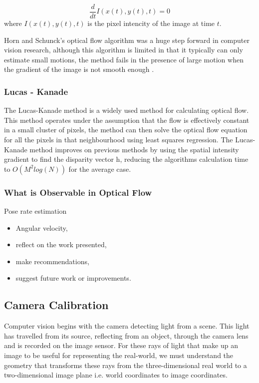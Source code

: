 \documentclass{UoNMCHA}
\numberwithin{equation}{section}
\begin{document}
\begin{equation}
	\frac{d}{dt} I(x(t), y(t), t) = 0
\end{equation}
where $I(x(t), y(t), t)$ is the pixel intencity of the image at time $t$.

Horn and Schunck's optical flow algorithm was a huge step forward in computer vision research, although this algorithm is limited in that it typically can only estimate small motions, the method fails in the presence of large motion when the gradient of the image is not smooth enough \citep{meinhardt2013horn}.
\subsubsection{Lucas - Kanade} %
The Lucas-Kanade method is a widely used method for calculating optical flow. This method operates under the assumption that the flow is effectively constant in a small cluster of pixels, the method can then solve the optical flow equation for all the pixels in that neighbourhood using least squares regression. The Lucas-Kanade method improves on previous methods by using the spatial intensity gradient to find the disparity vector h, reducing the algorithms calculation time to $O(M^2log(N))$ for the average case.

\subsubsection{What is Observable in Optical Flow}
Pose rate estimation

\begin{itemize}
	\item Angular velocity,
	\item reflect on the work presented, 
	\item make recommendations,
	\item suggest future work or improvements.
\end{itemize}

\subsection{Camera Calibration} %
Computer vision begins with the camera detecting light from a scene. This light has travelled from its source, reflecting from an object, through the camera lens and is recorded on the image sensor. For these rays of light that make up an image to be useful for representing the real-world, we must understand the geometry that transforms these rays from the three-dimensional real world to a two-dimensional image plane i.e. world coordinates to image coordinates.
\end{document}

